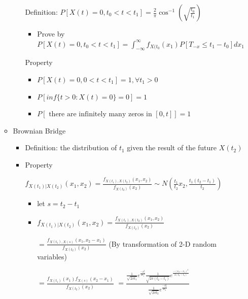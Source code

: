\documentclass[a4paper]{article}
\begin{document}
\begin{itemize}
\begin{itemize}
\begin{itemize}
                        Definition: $P[X(t) = 0, t_0 < t < t_1] = \frac{2}{\pi} \cos^{-1}(\sqrt{\frac{t_0}{t_1}})$
                        \begin{itemize}
                            \item Prove by $P[X(t) = 0, t_0 < t < t_1] = \int_{-\infty}^{\infty} f_{X(t_0}(x_1) P[T_{-x} \leq t_1 - t_0] dx_1$
                        \end{itemize}
                        Property
                        \begin{itemize}
                            \item $P[X(t) = 0, 0 < t < t_1] = 1, \forall t_1 > 0$
                            \item $P[\mathit{inf}\{t > 0: X(t)=0\} = 0] = 1$
                            \item $P[\text{ there are infinitely many zeros in }[0, t]] = 1$
                        \end{itemize}
                \end{itemize}
            \item Brownian Bridge
                \begin{itemize}
                    \item Definition: the distribution of $t_1$ given the result of the future $X(t_2)$
                    \item Property


                        $f_{X(t_1)|X(t_2)}(x_1, x_2) = \frac{f_{X(t_1), X(t_2)}(x_1, x_2)}{f_{X(t_2)}(x_2)} \sim N(\frac{t_1}{t_2}x_2, \frac{t_1(t_2 - t_1)}{t_2})$
                        \begin{itemize}
                            \item let $s = t_2 - t_1$
                            \item $f_{X(t_1)|X(t_2)}(x_1, x_2) = \frac{f_{X(t_1), X(t_2)}(x_1, x_2)}{f_{X(t_2)}(x_2)}$

                                $= \frac{f_{X(t_1), X(s)}(x_1, x_2 - x_1)}{f_{X(t_2)}(x_2)}$ (By transformation of 2-D random variables)

                                $= \frac{f_{X(t_1)}(x_1) f_{X(s)}(x_2 - x_1)}{f_{X(t_2)}(x_2)}$
                                $= \frac{\frac{1}{\sqrt{2\pi t_1}}e^{\frac{-x_1^2}{2t_1}} \frac{1}{\sqrt{2\pi(t_2 - t_1)}}e^{\frac{-(x_2-x_1)^2}{2(t_2 - t_1)}}}{\frac{1}{\sqrt{2\pi t_2}}e^{\frac{-x_2^2}{2t_2}}}$


\end{itemize}
\end{itemize}
\end{itemize}
\end{itemize}
\end{document}
